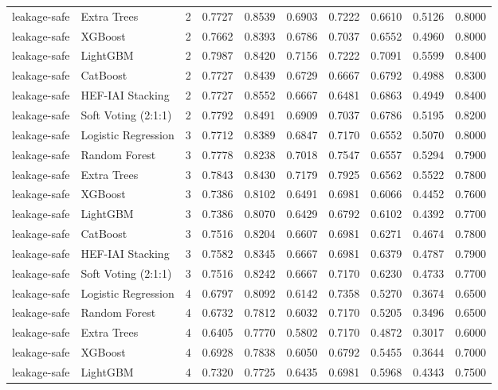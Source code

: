 \begin{tabular}{llrrrrrrrr}
leakage-safe & Extra Trees & 2 & 0.7727 & 0.8539 & 0.6903 & 0.7222 & 0.6610 & 0.5126 & 0.8000 \\
leakage-safe & XGBoost & 2 & 0.7662 & 0.8393 & 0.6786 & 0.7037 & 0.6552 & 0.4960 & 0.8000 \\
leakage-safe & LightGBM & 2 & 0.7987 & 0.8420 & 0.7156 & 0.7222 & 0.7091 & 0.5599 & 0.8400 \\
leakage-safe & CatBoost & 2 & 0.7727 & 0.8439 & 0.6729 & 0.6667 & 0.6792 & 0.4988 & 0.8300 \\
leakage-safe & HEF-IAI Stacking & 2 & 0.7727 & 0.8552 & 0.6667 & 0.6481 & 0.6863 & 0.4949 & 0.8400 \\
leakage-safe & Soft Voting (2:1:1) & 2 & 0.7792 & 0.8491 & 0.6909 & 0.7037 & 0.6786 & 0.5195 & 0.8200 \\
leakage-safe & Logistic Regression & 3 & 0.7712 & 0.8389 & 0.6847 & 0.7170 & 0.6552 & 0.5070 & 0.8000 \\
leakage-safe & Random Forest & 3 & 0.7778 & 0.8238 & 0.7018 & 0.7547 & 0.6557 & 0.5294 & 0.7900 \\
leakage-safe & Extra Trees & 3 & 0.7843 & 0.8430 & 0.7179 & 0.7925 & 0.6562 & 0.5522 & 0.7800 \\
leakage-safe & XGBoost & 3 & 0.7386 & 0.8102 & 0.6491 & 0.6981 & 0.6066 & 0.4452 & 0.7600 \\
leakage-safe & LightGBM & 3 & 0.7386 & 0.8070 & 0.6429 & 0.6792 & 0.6102 & 0.4392 & 0.7700 \\
leakage-safe & CatBoost & 3 & 0.7516 & 0.8204 & 0.6607 & 0.6981 & 0.6271 & 0.4674 & 0.7800 \\
leakage-safe & HEF-IAI Stacking & 3 & 0.7582 & 0.8345 & 0.6667 & 0.6981 & 0.6379 & 0.4787 & 0.7900 \\
leakage-safe & Soft Voting (2:1:1) & 3 & 0.7516 & 0.8242 & 0.6667 & 0.7170 & 0.6230 & 0.4733 & 0.7700 \\
leakage-safe & Logistic Regression & 4 & 0.6797 & 0.8092 & 0.6142 & 0.7358 & 0.5270 & 0.3674 & 0.6500 \\
leakage-safe & Random Forest & 4 & 0.6732 & 0.7812 & 0.6032 & 0.7170 & 0.5205 & 0.3496 & 0.6500 \\
leakage-safe & Extra Trees & 4 & 0.6405 & 0.7770 & 0.5802 & 0.7170 & 0.4872 & 0.3017 & 0.6000 \\
leakage-safe & XGBoost & 4 & 0.6928 & 0.7838 & 0.6050 & 0.6792 & 0.5455 & 0.3644 & 0.7000 \\
leakage-safe & LightGBM & 4 & 0.7320 & 0.7725 & 0.6435 & 0.6981 & 0.5968 & 0.4343 & 0.7500 \\

\end{tabular}
